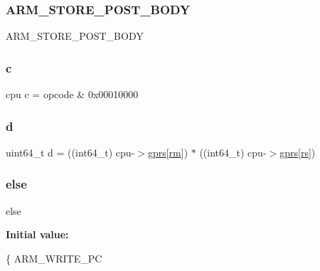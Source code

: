 \subsubsection{\texorpdfstring{A\+R\+M\+\_\+\+S\+T\+O\+R\+E\+\_\+\+P\+O\+S\+T\+\_\+\+B\+O\+DY}{ARM\_STORE\_POST\_BODY}}
{\footnotesize\ttfamily A\+R\+M\+\_\+\+S\+T\+O\+R\+E\+\_\+\+P\+O\+S\+T\+\_\+\+B\+O\+DY}

\mbox{\label{isa-arm_8c_ab27f9f98dd173bfc694f5d161e839d6e}} 
\subsubsection{\texorpdfstring{c}{c}}
{\footnotesize\ttfamily cpu c = opcode \& 0x00010000}

\mbox{\label{isa-arm_8c_af25cf54a35472b6bdc2836d8e8ef4c6a}} 
\subsubsection{\texorpdfstring{d}{d}}
{\footnotesize\ttfamily uint64\+\_\+t d = ((int64\+\_\+t) cpu-\/$>$\mbox{\hyperlink{isa-thumb_8c_a6b4b7e13a9a144391615b217c5917bc7}{gprs}}\mbox{[}\mbox{\hyperlink{isa-thumb_8c_a20e40d2fb8c51fa4dd2b4449ad32e111}{rm}}\mbox{]}) $\ast$ ((int64\+\_\+t) cpu-\/$>$\mbox{\hyperlink{isa-thumb_8c_a6b4b7e13a9a144391615b217c5917bc7}{gprs}}\mbox{[}\mbox{\hyperlink{isa-thumb_8c_a03b78d51ad860bbea2f9c98276d0b70b}{rs}}\mbox{]})}

\mbox{\label{isa-arm_8c_a0544c3fe466e421738dae463968b70ba}} 
\subsubsection{\texorpdfstring{else}{else}}
{\footnotesize\ttfamily else}

{\bfseries Initial value\+:}
\begin{DoxyCode}
\{
        ARM\_WRITE\_PC
\end{DoxyCode}
\mbox{\label{isa-arm_8c_a362077c979b0bb65159c603270e40f70}} 

